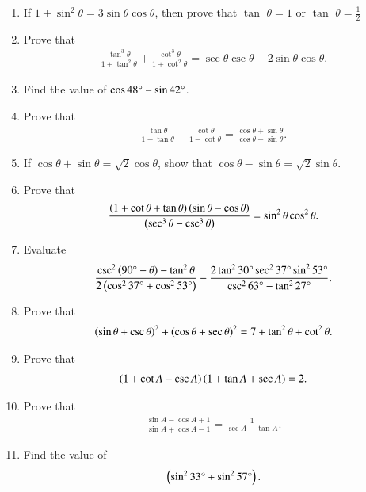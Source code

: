 \begin{enumerate}[label=\thesubsection.\arabic*,ref=\thesubsection.\theenumi,itemsep=1pt]
\hfill{}
\item If $1 + \sin^2 \theta  = 3 \sin \theta \cos \theta$, then prove that $\tan$ $\theta = 1 $ or $\tan$ $\theta = \frac{1}{2}$
\hfill{}\item Prove that 
\begin{align*}
\frac{\tan^3 \theta}{1+\tan^2 \theta} + \frac{\cot^3 \theta}{1 + \cot^2 \theta} =  \sec \theta  \csc  \theta - 2 \sin \theta \cos \theta  
.\end{align*}
\hfill{}
\item Find the value of $\cos {48\degree} - \sin {42\degree}$.
\hfill{}\item Prove that 
\begin{align*}
   {\frac{\tan\theta}{1-\tan\theta}} - {\frac{\cot\theta}{1-\cot\theta}}={\frac{\cos\theta+ \sin\theta}{\cos\theta-\sin\theta}}
.\end{align*}
\hfill{}\item If ${\cos\theta + \sin\theta} = {\sqrt 2}{\cos\theta}$, show that ${\cos\theta - \sin\theta} = {\sqrt 2}{\sin\theta}$.
\hfill{}\item Prove that 
\begin{align*}
    {\frac{\ensuremath{\left(1+\cot\theta+\tan\theta\right)}\ensuremath{\left(\sin\theta-\cos\theta\right)}}{\ensuremath{\left(\sec^3\theta-\csc^3\theta\right)}}} = \sin^2\theta \cos^2\theta
.\end{align*}
\hfill{}\item Evaluate 
\begin{align*}
    \frac{\csc^2\left(90\degree - \theta\right)-\tan^2\theta}{2\left(\cos^2 37\degree + \cos^2 53\degree\right)} - \frac{2\tan^2 30\degree \sec^2 37\degree \sin^2 53\degree}{\csc^2 63\degree - \tan^2 27\degree} 
.\end{align*}
  \hfill{}\item Prove that \begin{align*} \left(\sin\theta + \csc\theta\right)^2 + \left(\cos\theta + \sec\theta\right)^2 = 7 + \tan^2\theta + \cot^2\theta.\end{align*}
  \hfill{}\item Prove that \begin{align*}\left(1+\cot A - \csc A\right) \left(1 + \tan A +\sec A\right) = 2 .\end{align*}
  \hfill{}\item Prove that \begin{align*} \frac{\sin A-\cos A+1}{\sin A+ \cos A-1} =\frac{1}{\sec A-\tan A}.\end{align*}
  \hfill{}
\item Find the value of \begin{align*}\left(\sin^2 33\degree+ \sin^2 57\degree\right).\end{align*}
  

\end{enumerate}
